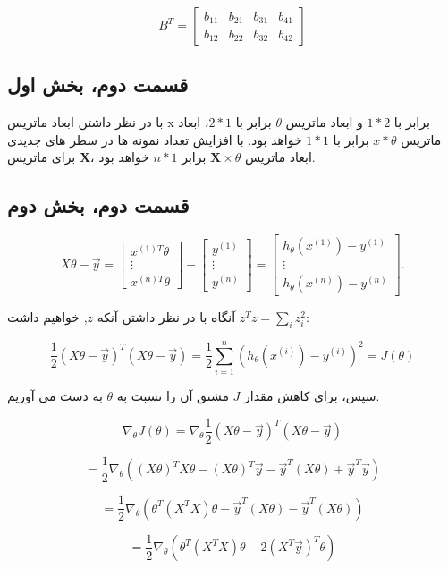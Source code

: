 \[
B^T =
\begin{bmatrix}
	b_{11} & b_{21} & b_{31} & b_{41} \\
	b_{12} & b_{22} & b_{32} & b_{42}
\end{bmatrix}
\]


\subsection{قسمت دوم، بخش اول}
با در نظر داشتن ابعاد ماتریس x برابر با $1*2$ و ابعاد ماتریس $\theta$ برابر با $2*1$، ابعاد ماتریس $x*\theta$ برابر با $1*1$ خواهد بود.
با افزایش تعداد نمونه ها در سطر های جدیدی برای ماتریس 
\textbf{X}،
ابعاد ماتریس 
$\textbf{X} \times \theta$
برابر 
$n*1$
خواهد بود.
\subsection{قسمت دوم، بخش دوم}
\[
X\theta - \vec{y} =
\begin{bmatrix}
	x^{(1)T}\theta \\
	\vdots \\
	x^{(n)T}\theta
\end{bmatrix}
-
\begin{bmatrix}
	y^{(1)} \\
	\vdots \\
	y^{(n)}
\end{bmatrix}
=
\begin{bmatrix}
	h_\theta(x^{(1)}) - y^{(1)} \\
	\vdots \\
	h_\theta(x^{(n)}) - y^{(n)}
\end{bmatrix}.
\]

آنگاه با در نظر داشتن آنکه \( z \), خواهیم داشت \( z^T z = \sum_i z_i^2 \):

\[
\frac{1}{2}(X\theta - \vec{y})^T(X\theta - \vec{y}) = \frac{1}{2}\sum_{i=1}^{n}(h_\theta(x^{(i)}) - y^{(i)})^2 = J(\theta)
\]

سپس، برای کاهش مقدار \( J \) مشتق آن را نسبت به \( \theta \) به دست می آوریم.

\[
\nabla_\theta J(\theta) = \nabla_\theta \frac{1}{2}(X\theta - \vec{y})^T(X\theta - \vec{y})
\]

\[
= \frac{1}{2}\nabla_\theta \left( (X\theta)^T X\theta - (X\theta)^T\vec{y} - \vec{y}^T (X\theta) + \vec{y}^T\vec{y} \right)
\]

\[
= \frac{1}{2}\nabla_\theta \left( \theta^T (X^T X)\theta - \vec{y}^T (X\theta) - \vec{y}^T (X\theta) \right)
\]

\[
= \frac{1}{2}\nabla_\theta \left( \theta^T (X^T X)\theta - 2(X^T\vec{y})^T\theta \right)
\]


